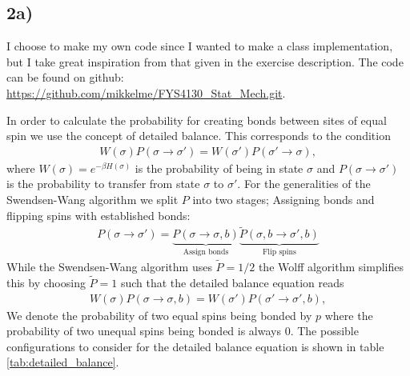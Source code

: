 \documentclass[reprint, amsmath, amssymb, aps, onecolumn]{revtex4-2}
\begin{document}
\subsection*{2a)}
\noindent I choose to make my own code since I wanted to make a class implementation, but I take great inspiration from that given in the exercise description. The code can be found on github: \\ 
\mbox{\url{https://github.com/mikkelme/FYS4130_Stat_Mech.git}}. \par
In order to calculate the probability for creating bonds between sites of equal spin we use the concept of detailed balance. This corresponds to the condition
\begin{align*}
  W(\sigma)P(\sigma\to\sigma') = W(\sigma')P(\sigma'\to\sigma),
\end{align*}
where $W(\sigma) = e^{-\beta H(\sigma)}$ is the probability of being in state $\sigma$ and $P(\sigma\to\sigma')$ is the probability to transfer from state $\sigma$ to $\sigma'$. For the generalities of the Swendsen-Wang algorithm we split $P$ into two stages; Assigning bonds and flipping spins with established bonds:
\begin{align*}
  P(\sigma \to \sigma') = \underbrace{P(\sigma \to \sigma, b)}_{\text{Assign bonds}} \underbrace{\tilde{P}(\sigma, b \to\sigma',b)}_{\text{Flip spins}}
\end{align*}
While the Swendsen-Wang algorithm uses $\tilde{P} = 1/2$ the Wolff algorithm simplifies this by choosing $\tilde{P}=1$ such that the detailed balance equation reads 
\begin{align*}
  W(\sigma)P(\sigma\to\sigma, b) = W(\sigma')P(\sigma'\to\sigma', b),
\end{align*}
We denote the probability of two equal spins being bonded by $p$ where the probability of two unequal spins being bonded is always 0. The possible configurations to consider for the detailed balance equation is shown in table \ref{tab:detailed_balance}.
\end{document}
